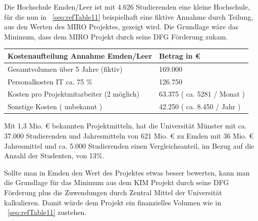 \documentclass[a4paper]{article}
\begin{document}
\bigskip

{\sffamily
Die Hochschule Emden/Leer ist mit 4.626 Studierenden eine kleine Hochschule, für die nun in
\tablename~\ref{seq:refTable11} beispielhaft eine fiktive Annahme durch Teilung, aus den Werten des MIRO Projektes,
gezeigt wird. Die Grundlage wäre das Minimum, dass dem MIRO Projekt durch seine DFG Förderung zukam.}


\bigskip

\begin{center}
\label{seq:refTable11}\tablefirsthead{}
\tablehead{}
\tabletail{}
\tablelasttail{}
\begin{supertabular}{|m{7.5490003cm}|m{4.852cm}|}
\hline
{\sffamily\bfseries\color{black} Kostenaufteilung Annahme Emden/Leer} &
{\sffamily\bfseries\color{black} Betrag in €}\\\hline
{\sffamily\color{black} Gesamtvolumen über 5 Jahre (fiktiv)} &
{\sffamily\color{black} 169.000}\\\hline
{\sffamily\color{black} Personalkosten IT ca. 75 \%} &
{\sffamily\color{black} 126.750}\\\hline
{\sffamily\color{black} Kosten pro Projektmitarbeiter (2 möglich)} &
{\sffamily\color{black} 63.375 ( ca. 5281 / Monat )}\\\hline
{\sffamily\color{black} Sonstige Kosten ( unbekannt )} &
{\sffamily\color{black} 42.250 ( ca. 8.450 / Jahr )}\\\hline
\end{supertabular}
\end{center}

\bigskip

{\sffamily
Mit 1,3 Mio. € bekannten Projektmitteln, hat die Universität Münster mit ca. 37.000 Studierenden und Jahresmitteln von
621 Mio. € zu Emden mit 36 Mio. € Jahresmittel und ca. 5.000 Studierenden einen Vergleichsanteil, im Bezug auf die
Anzahl der Studenten, von 13\%.}


\bigskip

{\sffamily
Sollte man in Emden den Wert des Projektes etwas besser bewerten, kann man die Grundlage für das Minimum aus dem KIM
Projekt durch seine DFG Förderung plus die Zuwendungen durch Zentral Mittel der Universität kalkulieren. Damit würde
dem Projekt ein finanzielles Volumen wie in \tablename~\ref{seq:refTable11} zustehen.}


\bigskip
\end{document}

